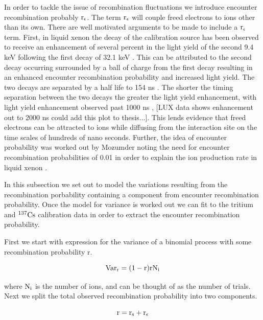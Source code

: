 In order to tackle the issue of recombination fluctuations we introduce encounter recombination probably $\rm r_\epsilon$. The term $\rm r_\epsilon$ will couple freed electrons to ions other than its own. There are well motivated arguments to be made to include a $\rm r_\epsilon$ term. First, in liquid xenon the decay of the calibration source \KrCal has been observed to receive an enhancement of several percent in the light yield of the second 9.4 keV following the first decay of 32.1 keV \cite{Start_Kr}. This can be attributed to the second decay occurring surrounded by a ball of charge from the first decay resulting in an enhanced encounter recombination probability and increased light yield. The two \KrCal decays are separated by a half life to 154 ns \cite{83Kr_HalfLife_1}. The shorter the timing separation between the two decays the greater the light yield enhancement, with light yield enhancement observed past 1000 ns \cite{Kastens}, \cite{Baudis} [LUX data shows enhancement out to 2000 ns could add this plot to thesis...]. This lends evidence that freed electrons can be attracted to ions while diffusing from the interaction site on the time scales of hundreds of nano seconds. Further, the idea of encounter probability was worked out by Mozumder noting the need for encounter recombination probabilities of 0.01 in order to explain the ion production rate in liquid xenon \cite{Mozumder}. 

In this subsection we set out to model the variations resulting from the recombination porbability containing a component from encounter recombination probability. Once the model for variance is worked out we can fit to the tritium and $\rm^{137}Cs$ calibration data in order to extract the encounter recombination probability. 

First we start with expression for the variance of a binomial process with some recombination probability r. 

\begin{equation}
\rm Var_r= (1-r)rN_i
\label{eq:Bino_Var2}
\end{equation}

\noindent where $\rm N_i$ is the number of ions, and can be thought of as the number of trials. Next we split the total observed recombination probability into two components.

\begin{equation}
\rm r=r_s + r_\epsilon
\label{eq:rs}
\end{equation}

